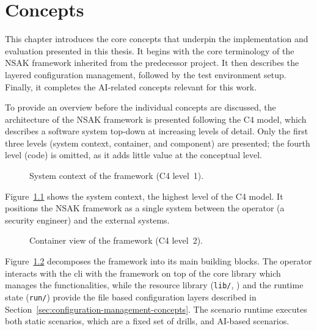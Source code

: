 
\chapter{Concepts}\label{ch:concepts}

This chapter introduces the core concepts that underpin the implementation and evaluation presented in this thesis.
It begins with the core terminology of the \gls{NSAK} framework inherited from the predecessor project.
It then describes the layered configuration management, followed by the test environment setup.
Finally, it completes the \gls{AI}-related concepts relevant for this work.

To provide an overview before the individual concepts are discussed, the architecture of the \gls{NSAK} framework is presented following the C4 model, which describes a software system top-down at increasing levels of detail.
Only the first three levels (system context, container, and component) are presented; the fourth level (code) is omitted, as it adds little value at the conceptual level.

\begin{figure}[H]
    \centering
    
    \caption{System context of the  framework (C4 level~1).}
    \label{fig:system-context}
\end{figure}

Figure~\ref{fig:system-context} shows the system context, the highest level of the C4 model.
It positions the \gls{NSAK} framework as a single system between the operator (a security engineer) and the external systems.

\begin{figure}[H]
    \centering
    
    \caption{Container view of the  framework (C4 level~2).}
    \label{fig:lean-component}
\end{figure}

Figure~\ref{fig:lean-component} decomposes the framework into its main building blocks.
The operator interacts with the cli with the framework on top of the core library which manages the functionalities, while
the resource library (\texttt{lib/}, ) and the runtime state (\texttt{run/}) provide the file based configuration layers described in Section~\ref{sec:configuration-management-concepts}.
The scenario runtime executes both static scenarios, which are a fixed set of drills, and \gls{AI}-based scenarios.

